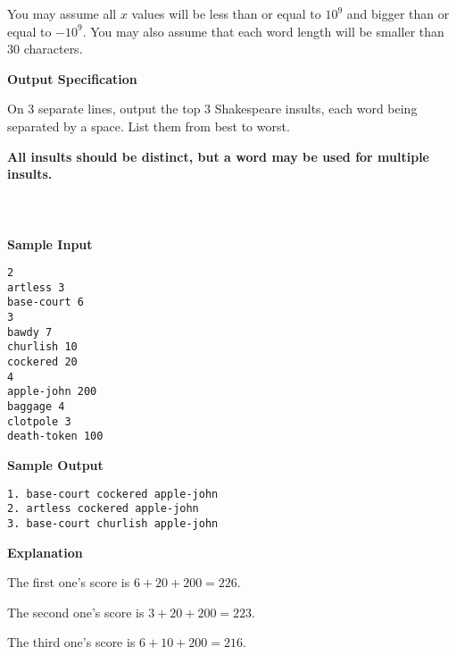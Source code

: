 \documentclass[]{article}
\begin{document}
You may assume all $x$ values will be less than or equal to $10^9$ and bigger than or equal to $-10^9$. You may also assume that each word length will be smaller than $30$ characters.

\textbf{\large Output Specification}
\par
On 3 separate lines, output the top 3 Shakespeare insults, each word being separated by a space. List them from best to worst.

\par
\textbf{All insults should be distinct, but a word may be used for multiple insults.}
\\\\\\\\
\textbf{\large Sample Input}
\begin{verbatim}
2
artless 3
base-court 6
3
bawdy 7
churlish 10
cockered 20
4
apple-john 200
baggage 4
clotpole 3
death-token 100
\end{verbatim}
\textbf{\large Sample Output}
\begin{verbatim}
1. base-court cockered apple-john
2. artless cockered apple-john
3. base-court churlish apple-john 
\end{verbatim}
\textbf{\large Explanation}
\par
The first one's score is $6 + 20 + 200 = 226$.

The second one's score is $3 + 20 + 200 = 223$.

The third one's score is $6 + 10 + 200 = 216$.

\thispagestyle{empty}
\end{document}
